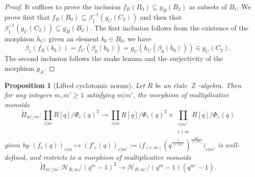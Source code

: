 \documentclass[10pt,twoside]{scrarticle}
\newtheorem{proposition}[theorem]{Proposition}
\theoremstyle{definition}
\DeclareMathOperator{\Z}{\mathbb{Z}}
\renewcommand{\ge}{\geqslant}
\numberwithin{equation}{theorem}
\begin{document}
\begin{proof}
    It suffices to prove the inclusion $f_B(B_0)\subseteq g_B(B_2)$ as subsets of $B_1$. We prove first that $f_B(B_0) \subseteq \beta_1^{-1}(g_C(C_2))$ and then that $\beta_1^{-1}(g_C(C_2)) \subseteq g_B(B_2)$. The first inclusion follows from the existence of the morphism $h_C$: given an element $b_0 \in B_0$, we have
    $$\beta_1(f_B(b_0)) = f_C(\beta_0(b_0)) = g_C(h_C(\beta_0(b_0))) \in g_C(C_2).$$
    The second inclusion follows the snake lemma and the surjectivity of the morphism $g_A$.
\end{proof}

\begin{proposition}[Lifted cyclotomic norms]\label{propositionliftedcyclotomicpower}
    Let $R$ be an étale $\Z$-algebra. Then for any integers $m,m' \ge 1$ satisfying $m|m'$, the morphism of multiplicative monoids
    \begin{equation}\label{eq:Pi-tilde}
    \tilde{\Pi}_{m'/m} : \prod_{e|m} R[q]/\Phi_e(q)^2 \longrightarrow \prod_{e|m} R[q]/\Phi_e(q)^2 \times \prod_{\substack{e|m' \\ e \nmid m}} R[q]/\Phi_e(q)
    \end{equation}
    given by $(f_e(q))_{e|m} \mapsto (f'_e(q))_{e|m'} := \big(f_{(e,m)}(q^{\frac{e}{(e,m)}})^{\frac{m'}{[e,m]}}\big)_{e|m'}$ is well-defined, and restricts to a morphism of multiplicative monoids
    $$\tilde{\Pi}_{m'/m} : \mathcal{H}_{R,m}/(q^m-1)^2 \longrightarrow \mathcal{H}_{R,m'}/(q^m-1)(q^{m'}-1).$$
\end{proposition}
\end{document}
